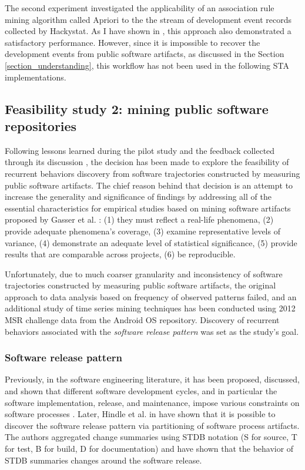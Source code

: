 The second experiment investigated the applicability of an association rule mining algorithm called Apriori \cite{citeulike:775528} to the the stream of development event records collected by Hackystat. As I have shown in \cite{citeulike:13159603}, this approach also demonstrated a satisfactory performance. However, since it is impossible to recover the development events from public software artifacts, as discussed in the Section \ref{section_understanding}, this workflow has not been used in the following STA implementations.

\subsection{Feasibility study 2: mining public software repositories} \label{feasibility2}
Following lessons learned during the pilot study and the feedback collected through its discussion \cite{csdl2-10-09}, 
the decision has been made to explore the feasibility of recurrent behaviors discovery from software trajectories constructed 
by measuring public software artifacts. The chief reason behind that decision is an attempt to increase 
the generality and significance of findings  by addressing all of the essential characteristics for empirical studies based on mining 
software artifacts proposed by Gasser et al. \cite{citeulike:13058334}:  
(1) they must reflect a real-life phenomena, 
(2) provide adequate phenomena's coverage, 
(3) examine representative levels of variance, 
(4) demonstrate an adequate level of statistical significance,
(5) provide results that are comparable across projects,
(6) be reproducible. 

Unfortunately, due to much coarser granularity and inconsistency of software trajectories constructed by measuring public software artifacts, the original approach to data analysis based on frequency of observed patterns failed, and an additional study of time series mining techniques has been conducted using 2012 MSR challenge data \cite{MSRChallenge2012} from the Android OS repository. Discovery of recurrent behaviors associated with the \textit{software release pattern} was set as the study's goal.

\subsubsection{Software release pattern}
Previously, in the software engineering literature, it has been proposed, discussed, and shown that different software development cycles, and in particular the software implementation, release, and maintenance, impose various constraints on software processes \cite{citeulike:1802027} \cite{citeulike:13374124} \cite{citeulike:13374128} \cite{citeulike:6086365}. Later, Hindle et al. in \cite{citeulike:10377366} have shown that it is possible to discover the software release pattern via partitioning of software process artifacts. The authors aggregated change summaries using STDB notation (S for source, T for test, B for build, D for documentation) and have shown that the behavior of STDB summaries changes around the software release.

